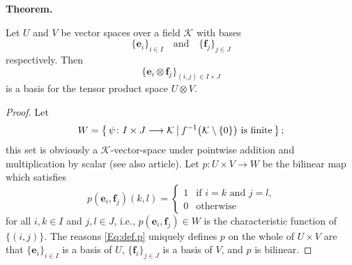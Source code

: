 \documentclass[12pt]{article}
\newenvironment{theorem}{%
   \trivlist\item\relax
   \textbf{Theorem.}\hspace*{0.5em}%
   \ignorespaces
}{\endtrivlist}
\newcommand{\Fpil}{\longrightarrow}
\newcommand{\vek}[1]{\mathbf{#1}}
\newcommand{\K}{\mathcal{K}}
\newcommand*{\setOfBig}[2]{%
   \left\{ \, #1 \,\,\vrule\relax\big.\,\, #2 \, \right\}%
}
\begin{document}
\begin{theorem}
  Let $U$ and $V$ be vector spaces over a field $\K$ with bases 
  $$
    \{\vek{e}_i\}_{i \in I} \quad\text{and}\quad 
    \{\vek{f}_j\}_{j \in J}
  $$
  respectively. Then
  \begin{equation} \label{Eq:ProdBas}
    \{ \vek{e}_i \otimes \vek{f}_j\}_{(i,j) \in I \times J}
  \end{equation}
  is a basis for the tensor product space $U \otimes V$.
\end{theorem}
\begin{proof}
  Let
  $$
    W = \setOfBig{ \psi\colon I \times J \Fpil \K }{
      f^{-1}\bigl( \K \setminus \{0\} \bigr) \text{ is finite}
    }\text{;}
  $$
  this set is obviously a $\K$-vector-space under pointwise addition 
  and multiplication by scalar (see also 
   article). 
  Let \(p\colon U \times V \Fpil W\) be 
  the bilinear map which satisfies
  \begin{equation} \label{Eq:def.p}
    p(\vek{e}_i,\vek{f}_j)(k,l) = \begin{cases}
      1& \text{if \(i=k\) and \(j=l\),}\\
      0& \text{otherwise}
    \end{cases}
  \end{equation}
  for all \(i,k \in I\) and \(j,l \in J\), i.e., 
  \(p(\vek{e}_i,\vek{f}_j) \in W\) is the characteristic function of 
  $\bigl\{(i,j)\bigr\}$. The reasons \eqref{Eq:def.p} uniquely 
  defines $p$ on the whole of $U \times V$ are that 
  $\{\vek{e}_i\}_{i \in I}$ is a basis of $U$, $\{\vek{f}_i\}_{j \in 
  J}$ is a basis of $V$, and $p$ is bilinear.
  

\end{proof}
\end{document}
